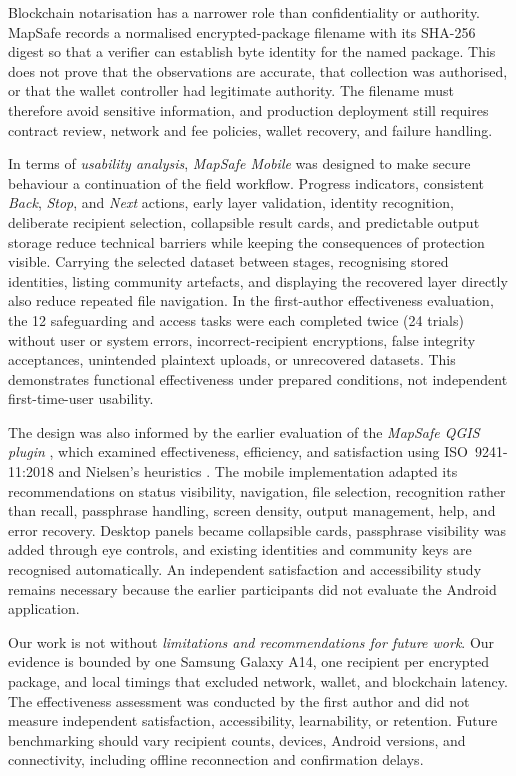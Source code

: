 \documentclass[]{interact}
\begin{document}
Blockchain notarisation has a narrower role than confidentiality or authority. MapSafe records a normalised encrypted-package filename with its SHA-256 digest so that a verifier can establish byte identity for the named package. This does not prove that the observations are accurate, that collection was authorised, or that the wallet controller had legitimate authority. The filename must therefore avoid sensitive information, and production deployment still requires contract review, network and fee policies, wallet recovery, and failure handling.

In terms of \textit{usability analysis}, \textit{MapSafe Mobile} was designed to make secure behaviour a continuation of the field workflow. Progress indicators, consistent \emph{Back}, \emph{Stop}, and \emph{Next} actions, early layer validation, identity recognition, deliberate recipient selection, collapsible result cards, and predictable output storage reduce technical barriers while keeping the consequences of protection visible. Carrying the selected dataset between stages, recognising stored identities, listing community artefacts, and displaying the recovered layer directly also reduce repeated file navigation. In the first-author effectiveness evaluation, the 12 safeguarding and access tasks were each completed twice (24 trials) without user or system errors, incorrect-recipient encryptions, false integrity acceptances, unintended plaintext uploads, or unrecovered datasets. This demonstrates functional effectiveness under prepared conditions, not independent first-time-user usability.

The design was also informed by the earlier evaluation of the \textit{MapSafe QGIS plugin} \citep{sharma2025mapsafe}, which examined effectiveness, efficiency, and satisfaction using ISO~9241-11:2018 \citep{ISO2018ergonomics} and Nielsen's heuristics \citep{nielsen1995conduct}. The mobile implementation adapted its recommendations on status visibility, navigation, file selection, recognition rather than recall, passphrase handling, screen density, output management, help, and error recovery. Desktop panels became collapsible cards, passphrase visibility was added through eye controls, and existing identities and community keys are recognised automatically. An independent satisfaction and accessibility study remains necessary because the earlier participants did not evaluate the Android application.

Our work is not without \textit{limitations and recommendations for future work}. 
Our evidence is bounded by one Samsung Galaxy A14, one recipient per encrypted package, and local timings that excluded network, wallet, and blockchain latency. The effectiveness assessment was conducted by the first author and did not measure independent satisfaction, accessibility, learnability, or retention. Future benchmarking should vary recipient counts, devices, Android versions, and connectivity, including offline reconnection and confirmation delays.
\end{document}
